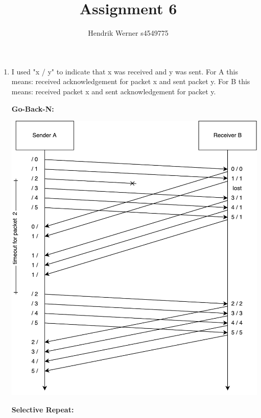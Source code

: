 \documentclass[12pt, a4paper]{article}
\title{Assignment 6}
\author{Hendrik Werner s4549775}
\begin{document}
\maketitle

\section{} %
\begin{enumerate}[a]
	\item %
	I used "x / y" to indicate that x was received and y was sent.
	For A this means: received acknowledgement for packet x and sent packet y.
	For B this means: received packet x and sent acknowledgement for packet y.

	\clearpage
	\textbf{Go-Back-N:}

	\includegraphics[width=\linewidth]{diagrams/GBN}

	\clearpage
	\textbf{Selective Repeat:}


\end{enumerate}
\end{document}
